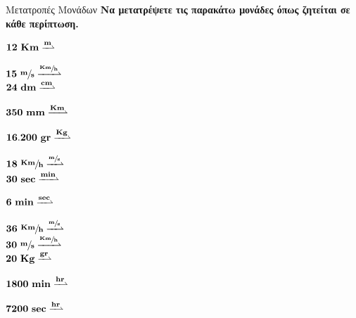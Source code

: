 \vspace{4mm}
\begin{askisi}[halign=flush left,label=ask:metatropesmonadon]{Μετατροπές Μονάδων}
\textbf{Να μετατρέψετε τις παρακάτω μονάδες όπως ζητείται σε κάθε περίπτωση.}
\tcblower
\vspace{1mm}

$\mathbf{
12 \text{ }Km \xrightharpoonup{m}}\\
$

$\mathbf{
15 }\text{ }\sfrac{\mathbf{m}}{\mathbf{s}}
\xrightharpoonup{\sfrac{\mathbf{Km}}{\mathbf{h}}}$\\

$\mathbf{
24 \text{ }dm \xrightharpoonup{cm}}\\
$

$\mathbf{
350\text{ }mm \xrightharpoonup{Km}}\\
$

$\mathbf{
16.200 \text{ } gr \xrightharpoonup{Kg}}\\
$

$
\mathbf{
18 }\text{ }\sfrac{\mathbf{Km}}{\mathbf{h}}
\xrightharpoonup{\sfrac{\mathbf{m}}{\mathbf{s}}}$\\

$\mathbf{
30 \text{ }sec \xrightharpoonup{min}}\\
$

$\mathbf{
6 \text{ }min \xrightharpoonup{sec}}\\
$

$
\mathbf{
36 }\text{ }\sfrac{\mathbf{Km}}{\mathbf{h}}
\xrightharpoonup{\sfrac{\mathbf{m}}{\mathbf{s}}}$\\

$\mathbf{
30 }\text{ }\sfrac{\mathbf{m}}{\mathbf{s}}
\xrightharpoonup{\sfrac{\mathbf{Km}}{\mathbf{h}}}$\\

$\mathbf{
20\text{ } Kg \xrightharpoonup{gr}}\\
$

$\mathbf{
1800 \text{ } min \xrightharpoonup{hr}}\\
$


$\mathbf{
7200 \text{ }sec \xrightharpoonup{hr}}\\
$

\end{askisi}


\clearpage

